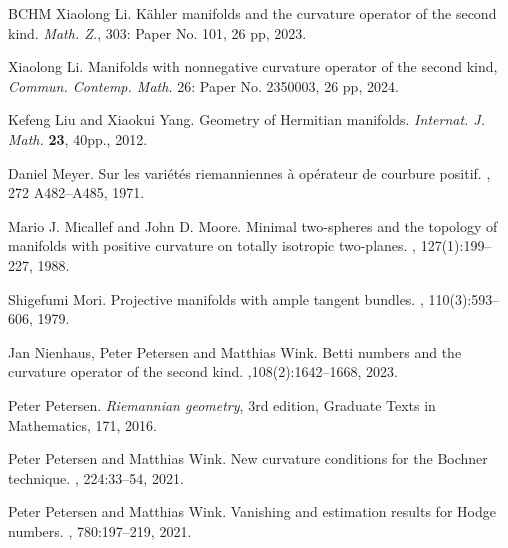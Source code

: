 \documentclass[12pt, reqno]{amsart}
\theoremstyle{plain}
\theoremstyle{definition}
\renewcommand{\>}{\rightarrow}
\renewcommand{\#}{\sharp}
\numberwithin{equation}{section} %
\begin{document}
\begin{thebibliography}{BCHM}
     Xiaolong Li.
    K\"ahler manifolds and the curvature operator of the second kind. {\emph{Math. Z.}},  303: Paper No. 101, 26 pp, 2023.

     Xiaolong Li. Manifolds with nonnegative curvature operator of the second kind, \emph{ Commun. Contemp. Math.}  26: Paper No. 2350003, 26 pp, 2024.

      Kefeng Liu and Xiaokui Yang. Geometry of Hermitian manifolds.
    \emph{Internat. J. Math.} \textbf{23}, 40pp., 2012.



    Daniel  Meyer.
    \newblock Sur les vari\'{e}t\'{e}s riemanniennes \`{a} op\'{e}rateur de courbure positif.
    , 272 A482--A485, 1971.

    Mario J. Micallef and John D. Moore.
    \newblock Minimal two-spheres and the topology of manifolds with positive curvature on totally isotropic two-planes.
    , 127(1):199--227, 1988.



    Shigefumi Mori.
    \newblock Projective manifolds with ample tangent bundles.
    , 110(3):593--606, 1979.

    Jan  Nienhaus, Peter Petersen and Matthias Wink.
    \newblock Betti numbers and the curvature operator of the second kind.
    ,108(2):1642--1668, 2023.





     Peter Petersen. {\it Riemannian geometry}, $3$rd edition,
    Graduate Texts in Mathematics, 171, 2016.

    Peter Petersen and Matthias Wink.
    \newblock New curvature conditions for the Bochner technique.
    , 224:33--54, 2021.

    Peter Petersen and Matthias Wink.
    \newblock Vanishing and estimation results for Hodge numbers.
    , 780:197--219, 2021.


\end{thebibliography}
\end{document}
